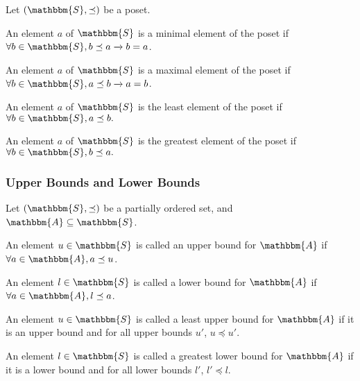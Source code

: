 \documentclass[14pt]{extarticle}
\newcommand{\impl}{\xrightarrow{}}
\newcommand{\A}{\mathbbm{A}}
\newcommand{\Sset}{\mathbbm{S}}
\newcommand{\pordereq}{\preceq}
\begin{document}
Let $(\Sset, \pordereq)$ be a poset. 

An element $a$ of $\Sset$ is a minimal element of the poset if $\forall b \in \Sset, b \pordereq a \impl b = a$.

An element $a$ of $\Sset$ is a maximal element of the poset if $\forall b \in \Sset, a \pordereq b \impl a = b$.

An element $a$ of $\Sset$ is the least element of the poset if $\forall b \in \Sset, a \pordereq b.$

An element $a$ of $\Sset$ is the greatest element of the poset if $\forall b \in \Sset, b \pordereq a.$

\subsubsection{Upper Bounds and Lower Bounds}

Let $(\Sset, \pordereq)$ be a partially ordered set, and $\A \subseteq \Sset$.

An element $u \in \Sset$ is called an upper bound for $\A$ if $\forall a \in \A, a \pordereq u$.

An element $l \in \Sset$ is called a lower bound for $\A$ if $\forall a \in \A, l \pordereq a$.

An element $u \in \Sset$ is called a least upper bound for $\A$ if it is an upper bound and for all upper bounds $u'$, $u \pordereq u'$.

An element $l \in \Sset$ is called a greatest lower bound for $\A$ if it is a lower bound and for all lower bounds $l'$, $l' \pordereq l$.
\end{document}
